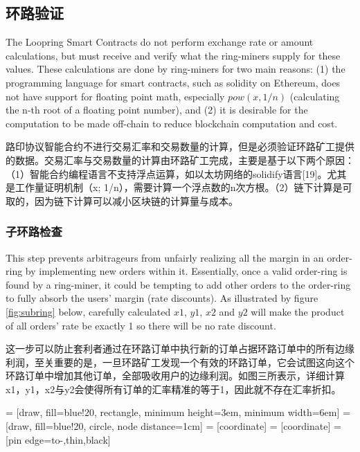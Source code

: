 \documentclass[UTF8,nofonts]{ctexart}
\makeatletter
\newenvironment{figurehere}
 {\def\@captype{figure}}
 {}
\makeatother
\begin{document}
\begin{multicols}{2}
\begin{enumerate}
\end{enumerate}



\subsection{环路验证\label{sec:ring_verification}}

The Loopring Smart Contracts do not perform exchange rate or amount calculations, but must receive and verify what the ring-miners supply for these values. These calculations are done by ring-miners for two main reasons: (1) the programming language for smart contracts, such as solidity\cite{dannen2017introducing} on Ethereum, does not have support for floating point math, especially $pow(x, 1/n)$ (calculating the n-th root of a floating point number), and (2) it is desirable for the computation to be made off-chain to reduce blockchain computation and cost.

路印协议智能合约不进行交易汇率和交易数量的计算，但是必须验证环路矿工提供的数据。交易汇率与交易数量的计算由环路矿工完成，主要是基于以下两个原因：（1）智能合约编程语言不支持浮点运算，如以太坊网络的solidify语言[19]。尤其是工作量证明机制（x; 1/n），需要计算一个浮点数的n次方根。（2）链下计算是可取的，因为链下计算可以减小区块链的计算量与成本。


\subsubsection{子环路检查\label{sec:sub_ring_check}}
This step prevents arbitrageurs from unfairly realizing all the margin in an order-ring by implementing new orders within it. Essentially, once a valid order-ring is found by a ring-miner, it could be tempting to add other orders to the order-ring to fully absorb the users' margin (rate discounts). As illustrated by figure \ref{fig:subring} below, carefully calculated $x1$, $y1$, $x2$ and $y2$ will make the product of all orders' rate be exactly 1 so there will be no rate discount. 

这一步可以防止套利者通过在环路订单中执行新的订单占据环路订单中的所有边缘利润，至关重要的是，一旦环路矿工发现一个有效的环路订单，它会试图这向这个环路订单中增加其他订单，全部吸收用户的边缘利润。如图三所表示，详细计算x1，y1，x2与y2会使得所有订单的汇率精准的等于1，因此就不存在汇率折扣。


\begin{center}
\begin{figurehere}
\centering
{} = [draw, fill=blue!20, rectangle, 
    minimum height=3em, minimum width=6em]
 = [draw, fill=blue!20, circle, node distance=1cm]
 = [coordinate]
 = [coordinate]
 = [pin edge={to-,thin,black}]


\end{figurehere}
\end{center}
\end{multicols}
\end{document}
